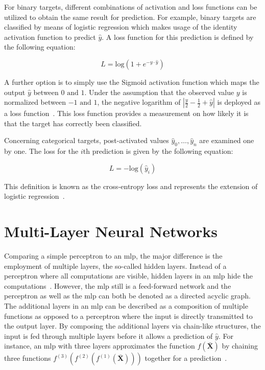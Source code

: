 \documentclass[draft,final]{vutinfth} %
\newcommand{\p}[1]{see p. #1}
\begin{document}
    For binary targets, different combinations of activation and loss functions can be utilized to obtain the same result for prediction.
    For example, binary targets are classified by means of logistic regression which makes usage of the identity activation function to predict $\hat{y}$.
    A loss function for this prediction is defined by the following equation:

    \begin{equation}
        L=\text{log}(1+e^{-y\cdot\hat{y}})
    \end{equation}

    A further option is to simply use the Sigmoid activation function which maps the output $\hat{y}$ between $0 \text{ and } 1$.
    Under the assumption that the observed value $y$ is normalized between $-1 \text{ and } 1$, the negative logarithm of $|\frac{y}{2}-\frac{1}{2}+\hat{y}|$ is deployed as a loss function~\citep[\p{15}]{aggarwal_neural_2018}.
    This loss function provides a measurement on how likely it is that the target has correctly been classified.

    Concerning categorical targets, post-activated values $\hat{y}_0,\ldots,\hat{y}_n$ are examined one by one.
    The loss for the $i$th prediction is given by the following equation:

    \begin{equation}
        L=-\text{log}(\hat{y}_i)
    \end{equation}

    This definition is known as the cross-entropy loss and represents the extension of logistic regression~\citep[\p{15}]{aggarwal_neural_2018}.


    \section{Multi-Layer Neural Networks}
    Comparing a simple perceptron to an \gls{mlp}, the major difference is the employment of multiple layers, the so-called hidden layers.
    Instead of a perceptron where all computations are visible, hidden layers in an \gls{mlp} hide the computations~\citep[\p{17}]{aggarwal_neural_2018}.
    However, the \gls{mlp} still is a feed-forward network and the perceptron as well as the \gls{mlp} can both be denoted as a directed acyclic graph.
    The additional layers in an \gls{mlp} can be described as a composition of multiple functions as opposed to a perceptron where the input is directly transmitted to the output layer.
    By composing the additional layers via chain-like structures, the input is fed through multiple layers before it allows a prediction of $\hat{y}$.
    For instance, an \gls{mlp} with three layers approximates the function $f(\bar{\boldsymbol{X}})$ by chaining three functions $f^{(3)}(f^{(2)}(f^{(1)}(\bar{\boldsymbol{X}})))$ together for a prediction~\citep[\p{163f}]{goodfellow_deep_2016}.
\end{document}

